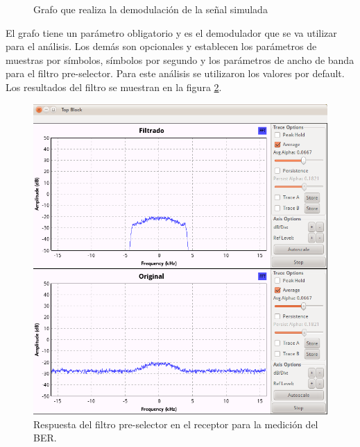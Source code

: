 \begin{figure}[htp]
  \centering
  \vspace{0.3in}
  \vspace{0.3in}
  \label{fig:analizer}
  \caption{Grafo que realiza la demodulaci\'on de la se\~nal simulada}
\end{figure}

El grafo tiene un par\'ametro obligatorio y es el demodulador que se va utilizar para el an\'alisis.
Los dem\'as son opcionales y establecen los par\'ametros de muestras por s\'imbolos, s\'imbolos
por segundo y los par\'ametros de ancho de banda para el filtro pre-selector. Para este an\'alisis
se utilizaron los valores por default. Los resultados del filtro se muestran en la figura
\ref{fig:predetect}.

\begin{figure}[htp]
  \centering
  \includegraphics[scale=0.5]{figs/predetectfilter}
  \caption{Respuesta del filtro pre-selector en el receptor para la medici\'on del BER.}
  \label{fig:predetect}
\end{figure}

